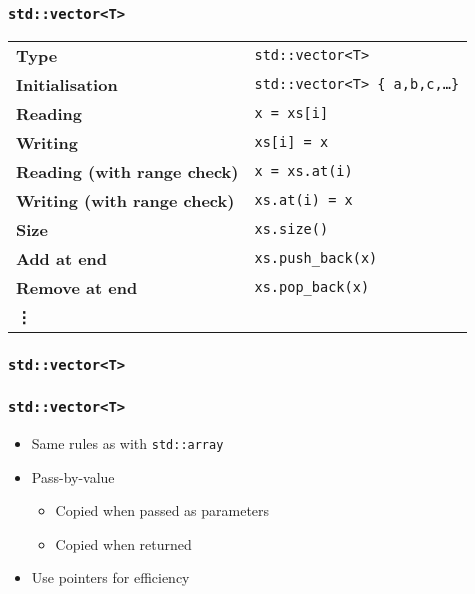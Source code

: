 \documentclass{../ucll-slides}
\begin{document}
\begin{frame}
  \frametitle{\tt std::vector<T>}
  \begin{center}
    \begin{tabular}{ll}
      \bf Type & {\tt std::vector<T>} \\[2mm]
      \bf Initialisation & {\tt std::vector<T> \{ a,b,c,\dots \}} \\[2mm]
      \bf Reading & {\tt x = xs[i]} \\[2mm]
      \bf Writing & {\tt xs[i] = x} \\[2mm]
      \bf Reading (with range check) & {\tt x = xs.at(i)} \\[2mm]
      \bf Writing (with range check) & {\tt xs.at(i) = x} \\[2mm]
      \bf Size & {\tt xs.size()} \\[2mm]
      \bf Add at end & {\tt xs.push\_back(x)} \\[2mm]
      \bf Remove at end & {\tt xs.pop\_back(x)} \\[2mm]
      \bf \vdots
    \end{tabular}
  \end{center}
\end{frame}

\begin{frame}
  \frametitle{\tt std::vector<T>}
\end{frame}

\begin{frame}
  \frametitle{\tt std::vector<T>}
  \begin{itemize}
    \item Same rules as with {\tt std::array}
    \item Pass-by-value
          \begin{itemize}
            \item Copied when passed as parameters
            \item Copied when returned
          \end{itemize}
    \item Use pointers for efficiency
  \end{itemize}
\end{frame}
\end{document}
